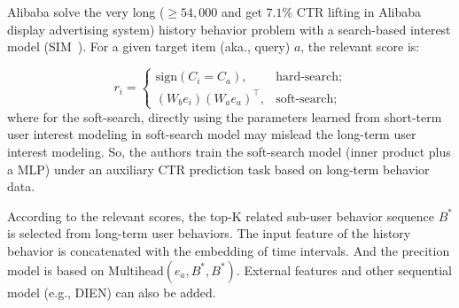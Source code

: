 
Alibaba solve the very long ($\ge 54,000$ and get $7.1\%$ CTR lifting in Alibaba display advertising system) history behavior problem with a search-based interest model (SIM~).
For a given target item (aka., query) $a$, the relevant score is:

\begin{equation}
	r_i = \begin{cases}
		\text{sign} (C_i = C_a), &\text{hard-search;} \\
		(W_b e_i) (W_a e_a)^\top, &\text{soft-search;}
	\end{cases}
\end{equation}
where for the soft-search, directly using the parameters learned from short-term user interest modeling in soft-search model may mislead the long-term user interest modeling.
So, the authors train the soft-search model (inner product plus a MLP) under an auxiliary CTR prediction task based on long-term behavior data.

According to the relevant scores, the top-K related sub-user behavior sequence $B^*$ is selected from long-term user behaviors.
The input feature of the history behavior is concatenated with the embedding of time intervals.
And the precition model is based on $\text{Multihead}(e_a, B^*, B^*)$.
External features and other sequential model (e.g., DIEN) can also be added.
